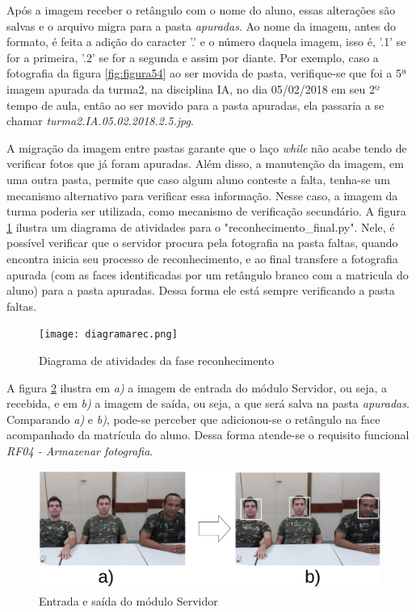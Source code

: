 Após a imagem receber o retângulo com o nome do aluno, essas alterações são salvas e o arquivo migra para a pasta \textit{apuradas}. Ao nome da imagem, antes do formato, é feita a adição do caracter '.'  e o número daquela imagem, isso é, '.1' se for a primeira, '.2' se for a segunda e assim por diante. Por exemplo, caso a fotografia da figura \ref{fig:figura54} ao ser movida de pasta, verifique-se que foi a 5ª imagem apurada da turma2, na disciplina IA, no dia 05/02/2018 em seu 2º tempo de aula, então ao ser movido para a pasta apuradas, ela passaria a se chamar \textit{turma2.IA.05.02.2018.2.5.jpg}. 

A migração da imagem entre pastas garante que o laço \textit{while} não acabe tendo de verificar fotos que já foram apuradas. Além disso, a manutenção da imagem, em uma outra pasta, permite que caso algum aluno conteste  a falta, tenha-se um mecanismo alternativo para verificar essa informação. Nesse caso, a imagem da turma poderia ser utilizada, como mecanismo de verificação secundário. A figura \ref{fig:figura57} ilustra um diagrama de atividades para o "reconhecimento\_final.py". Nele, é possível verificar que o servidor procura pela fotografia na pasta faltas, quando encontra inicia seu processo de reconhecimento, e ao final transfere a fotografia apurada (com as faces identificadas por um retângulo branco com a matricula do aluno) para a pasta apuradas. Dessa forma ele está sempre verificando a pasta faltas.
   
\begin{figure}[!ht]
	\centering
	\texttt{[image: diagramarec.png]}   
	\caption{Diagrama de atividades da fase reconhecimento}
	\label{fig:figura57}
\end{figure}

A figura \ref{fig:figura58} ilustra em \textit{a)} a imagem de entrada do módulo Servidor, ou seja, a  recebida, e em \textit{b)} a imagem de saída, ou seja, a que será salva na pasta \textit{apuradas}. Comparando \textit{a)} e \textit{b)}, pode-se perceber que  adicionou-se o retângulo na face acompanhado da matrícula do aluno. Dessa forma atende-se o requisito funcional \textit{RF04 - Armazenar fotografia}.

\begin{figure}[!ht]
	\centering
	\includegraphics[width=1.0\textwidth]{antesdepoisbranco.png}   
	\caption{Entrada e saída do módulo Servidor}
	\label{fig:figura58}
\end{figure}
